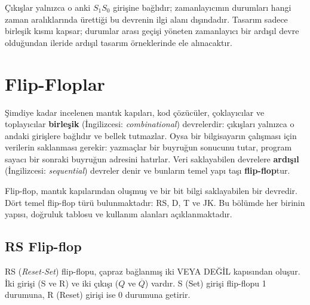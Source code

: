 \begin{ornek}[B.13]
\begin{center}
\end{center}

Çıkışlar yalnızca o anki $S_1 S_0$ girişine bağlıdır; zamanlayıcının durumları hangi zaman aralıklarında ürettiği bu devrenin ilgi alanı dışındadır. Tasarım sadece birleşik kısmı kapsar; durumlar arası geçişi yöneten zamanlayıcı bir ardışıl devre olduğundan ileride ardışıl tasarım örneklerinde ele alınacaktır.
\end{ornek}


\section{Flip-Floplar}

Şimdiye kadar incelenen mantık kapıları, kod çözücüler, çoklayıcılar ve toplayıcılar \textbf{birleşik} (İngilizcesi: \textit{combinational}) devrelerdir: çıkışları yalnızca o andaki girişlere bağlıdır ve bellek tutmazlar. Oysa bir bilgisayarın çalışması için verilerin saklanması gerekir: yazmaçlar bir buyruğun sonucunu tutar, program sayacı bir sonraki buyruğun adresini hatırlar. Veri saklayabilen devrelere \textbf{ardışıl} (İngilizcesi: \textit{sequential}) devreler denir ve bunların temel yapı taşı \textbf{flip-flop}tur.

Flip-flop, mantık kapılarından oluşmuş ve bir bit bilgi saklayabilen bir devredir. Dört temel flip-flop türü bulunmaktadır: RS, D, T ve JK. Bu bölümde her birinin yapısı, doğruluk tablosu ve kullanım alanları açıklanmaktadır.


\subsection{RS Flip-flop}

RS (\emph{Reset-Set}) flip-flopu, çapraz bağlanmış iki VEYA DEĞİL kapısından oluşur. İki girişi (S ve R) ve iki çıkışı ($Q$ ve $\overline{Q}$) vardır. S (Set) girişi flip-flopu 1 durumuna, R (Reset) girişi ise 0 durumuna getirir.

